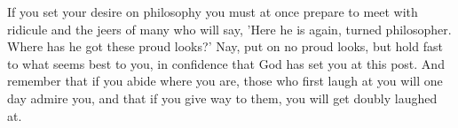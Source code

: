 If you  set your desire  on philosophy  you must at  once prepare to  meet with
ridicule  and the  jeers  of many  who  will  say, 'Here  he  is again,  turned
philosopher. Where has he  got these proud looks?' Nay, put  on no proud looks,
but hold fast to what seems best to  you, in confidence that God has set you at
this post. And remember that if you  abide where you are, those who first laugh
at you will one day admire you, and that  if you give way to them, you will get
doubly laughed at.
